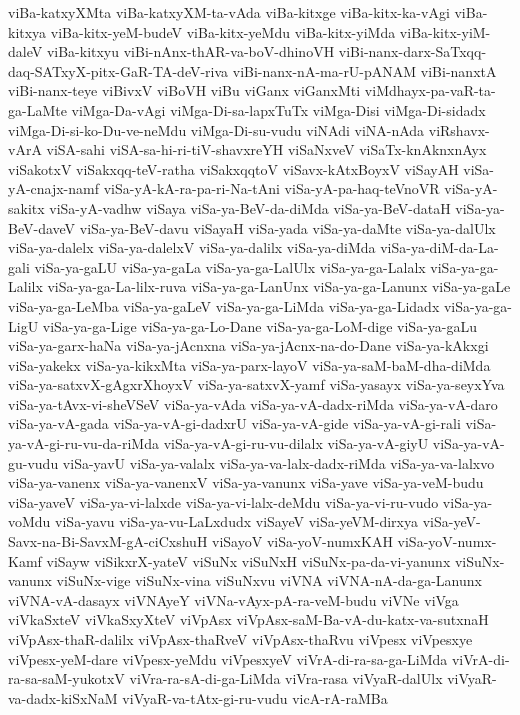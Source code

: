 {viBa-katxyXMta
viBa-katxyXM-ta-vAda
viBa-kitxge
viBa-kitx-ka-vAgi
viBa-kitxya
viBa-kitx-yeM-budeV
viBa-kitx-yeMdu
viBa-kitx-yiMda
viBa-kitx-yiM-daleV
viBa-kitxyu
viBi-nAnx-thAR-va-boV-dhinoVH
viBi-nanx-darx-SaTxqq-daq-SATxyX-pitx-GaR-TA-deV-riva
viBi-nanx-nA-ma-rU-pANAM
viBi-nanxtA
viBi-nanx-teye
viBivxV
viBoVH
viBu
viGanx
viGanxMti
viMdhayx-pa-vaR-ta-ga-LaMte
viMga-Da-vAgi
viMga-Di-sa-lapxTuTx
viMga-Disi
viMga-Di-sidadx
viMga-Di-si-ko-Du-ve-neMdu
viMga-Di-su-vudu
viNAdi
viNA-nAda
viRshavx-vArA
viSA-sahi
viSA-sa-hi-ri-tiV-shavxreYH
viSaNxveV
viSaTx-knAknxnAyx
viSakotxV
viSakxqq-teV-ratha
viSakxqqtoV
viSavx-kAtxBoyxV
viSayAH
viSa-yA-cnajx-namf
viSa-yA-kA-ra-pa-ri-Na-tAni
viSa-yA-pa-haq-teVnoVR
viSa-yA-sakitx
viSa-yA-vadhw
viSaya
viSa-ya-BeV-da-diMda
viSa-ya-BeV-dataH
viSa-ya-BeV-daveV
viSa-ya-BeV-davu
viSayaH
viSa-yada
viSa-ya-daMte
viSa-ya-dalUlx
viSa-ya-dalelx
viSa-ya-dalelxV
viSa-ya-dalilx
viSa-ya-diMda
viSa-ya-diM-da-La-gali
viSa-ya-gaLU
viSa-ya-gaLa
viSa-ya-ga-LalUlx
viSa-ya-ga-Lalalx
viSa-ya-ga-Lalilx
viSa-ya-ga-La-lilx-ruva
viSa-ya-ga-LanUnx
viSa-ya-ga-Lanunx
viSa-ya-gaLe
viSa-ya-ga-LeMba
viSa-ya-gaLeV
viSa-ya-ga-LiMda
viSa-ya-ga-Lidadx
viSa-ya-ga-LigU
viSa-ya-ga-Lige
viSa-ya-ga-Lo-Dane
viSa-ya-ga-LoM-dige
viSa-ya-gaLu
viSa-ya-garx-haNa
viSa-ya-jAcnxna
viSa-ya-jAcnx-na-do-Dane
viSa-ya-kAkxgi
viSa-yakekx
viSa-ya-kikxMta
viSa-ya-parx-layoV
viSa-ya-saM-baM-dha-diMda
viSa-ya-satxvX-gAgxrXhoyxV
viSa-ya-satxvX-yamf
viSa-yasayx
viSa-ya-seyxYva
viSa-ya-tAvx-vi-sheVSeV
viSa-ya-vAda
viSa-ya-vA-dadx-riMda
viSa-ya-vA-daro
viSa-ya-vA-gada
viSa-ya-vA-gi-dadxrU
viSa-ya-vA-gide
viSa-ya-vA-gi-rali
viSa-ya-vA-gi-ru-vu-da-riMda
viSa-ya-vA-gi-ru-vu-dilalx
viSa-ya-vA-giyU
viSa-ya-vA-gu-vudu
viSa-yavU
viSa-ya-valalx
viSa-ya-va-lalx-dadx-riMda
viSa-ya-va-lalxvo
viSa-ya-vanenx
viSa-ya-vanenxV
viSa-ya-vanunx
viSa-yave
viSa-ya-veM-budu
viSa-yaveV
viSa-ya-vi-lalxde
viSa-ya-vi-lalx-deMdu
viSa-ya-vi-ru-vudo
viSa-ya-voMdu
viSa-yavu
viSa-ya-vu-LaLxdudx
viSayeV
viSa-yeVM-dirxya
viSa-yeV-Savx-na-Bi-SavxM-gA-ciCxshuH
viSayoV
viSa-yoV-numxKAH
viSa-yoV-numx-Kamf
viSayw
viSikxrX-yateV
viSuNx
viSuNxH
viSuNx-pa-da-vi-yanunx
viSuNx-vanunx
viSuNx-vige
viSuNx-vina
viSuNxvu
viVNA
viVNA-nA-da-ga-Lanunx
viVNA-vA-dasayx
viVNAyeY
viVNa-vAyx-pA-ra-veM-budu
viVNe
viVga
viVkaSxteV
viVkaSxyXteV
viVpAsx
viVpAsx-saM-Ba-vA-du-katx-va-sutxnaH
viVpAsx-thaR-dalilx
viVpAsx-thaRveV
viVpAsx-thaRvu
viVpesx
viVpesxye
viVpesx-yeM-dare
viVpesx-yeMdu
viVpesxyeV
viVrA-di-ra-sa-ga-LiMda
viVrA-di-ra-sa-saM-yukotxV
viVra-ra-sA-di-ga-LiMda
viVra-rasa
viVyaR-dalUlx
viVyaR-va-dadx-kiSxNaM
viVyaR-va-tAtx-gi-ru-vudu
vicA-rA-raMBa
}
